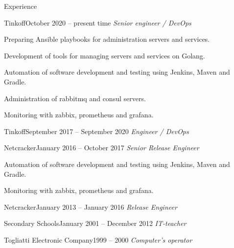 \documentclass{resume} %
\begin{document}
\begin{rSection}{Experience}

\begin{rSubsection}{Tinkoff}{October 2020 -- present time}{}{} %
{\em Senior engineer / DevOps\/} \par
\item Preparing Ansible playbooks for administration servers and services.
\item Development of tools for managing servers and services on Golang.
\item Automation of software development and testing using Jenkins, Maven and Gradle.
\item Administration of rabbitmq and consul servers.
\item Monitoring with zabbix, prometheus and grafana.
\end{rSubsection}

\begin{rSubsection}{Tinkoff}{September 2017 -- September 2020}{}{} %
{\em Engineer / DevOps\/} \par
\end{rSubsection}

\begin{rSubsection}{Netcracker}{January 2016 -- October 2017}{}{} %
{\em Senior Release Engineer\/} \par
\item Automation of software development and testing using Jenkins, Maven and Gradle.
\item Monitoring with zabbix, prometheus and grafana.
\end{rSubsection}

\begin{rSubsection}{Netcracker}{January 2013 -- January 2016}{}{} %
{\em Release Engineer\/} \par
\end{rSubsection}

\begin{rSubsection}{Secondary Schools}{January 2001 -- December 2012}{}{} %
{\em IT-teacher\/}
\end{rSubsection}

\begin{rSubsection}{Togliatti Electronic Company}{1999 -- 2000}{}{} %
{\em Computer's operator\/}
\end{rSubsection}



\end{rSection}
\end{document}
